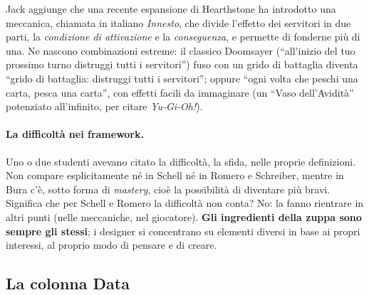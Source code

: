 Jack aggiunge che una recente espansione di Hearthstone ha introdotto una
meccanica, chiamata in italiano \emph{Innesto}, che divide l'effetto dei
servitori in due parti, la \emph{condizione di attivazione} e la
\emph{conseguenza}, e permette di fonderne più di una. Ne nascono combinazioni
estreme: il classico Doomsayer (``all'inizio del tuo prossimo turno distruggi
tutti i servitori'') fuso con un grido di battaglia diventa ``grido di
battaglia: distruggi tutti i servitori''; oppure ``ogni volta che peschi una
carta, pesca una carta'', con effetti facili da immaginare (un ``Vaso
dell'Avidità'' potenziato all'infinito, per citare \emph{Yu-Gi-Oh!}).

\paragraph{La difficoltà nei framework.} Uno o due studenti avevano citato la
difficoltà, la sfida, nelle proprie definizioni. Non compare esplicitamente né
in Schell né in Romero e Schreiber, mentre in Bura c'è, sotto forma di
\emph{mastery}, cioè la possibilità di diventare più bravi. Significa che per
Schell e Romero la difficoltà non conta? No: la fanno rientrare in altri punti
(nelle meccaniche, nel giocatore). \textbf{Gli ingredienti della zuppa sono
sempre gli stessi}; i designer si concentrano su elementi diversi in base ai
propri interessi, al proprio modo di pensare e di creare.

\subsection{La colonna Data}

